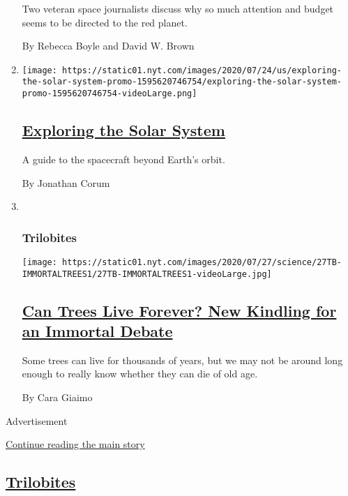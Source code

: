 \begin{enumerate}
  Two veteran space journalists discuss why so much attention and budget
  seems to be directed to the red planet.

  By Rebecca Boyle and David W. Brown
\item
  \texttt{[image: https://static01.nyt.com/images/2020/07/24/us/exploring-the-solar-system-promo-1595620746754/exploring-the-solar-system-promo-1595620746754-videoLarge.png]}

  \hypertarget{exploring-the-solar-system}{%
  \subsection{\texorpdfstring{\href{/interactive/2020/science/exploring-the-solar-system.html}{Exploring
  the Solar
  System}}{Exploring the Solar System}}\label{exploring-the-solar-system}}

  A guide to the spacecraft beyond Earth's orbit.

  By Jonathan Corum
\item ~
  \hypertarget{trilobites-1}{%
  \subsubsection{Trilobites}\label{trilobites-1}}

  \texttt{[image: https://static01.nyt.com/images/2020/07/27/science/27TB-IMMORTALTREES1/27TB-IMMORTALTREES1-videoLarge.jpg]}

  \hypertarget{can-trees-live-forever-new-kindling-for-an-immortal-debate}{%
  \subsection{\texorpdfstring{\href{/2020/07/27/science/trees-immortality.html}{Can
  Trees Live Forever? New Kindling for an Immortal
  Debate}}{Can Trees Live Forever? New Kindling for an Immortal Debate}}\label{can-trees-live-forever-new-kindling-for-an-immortal-debate}}

  Some trees can live for thousands of years, but we may not be around
  long enough to really know whether they can die of old age.

  By Cara Giaimo
\end{enumerate}

Advertisement

\protect\hyperlink{after-mid1}{Continue reading the main story}

\hypertarget{trilobites-2}{%
\subsection{\texorpdfstring{\href{/column/trilobites}{Trilobites}}{Trilobites}}\label{trilobites-2}}

